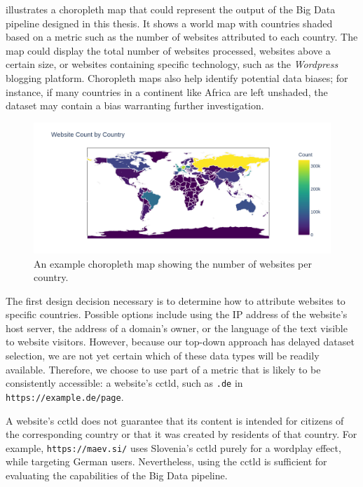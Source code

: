  illustrates a choropleth map that could represent the output of the Big Data pipeline designed in this thesis.
It shows a world map with countries shaded based on a metric such as the number of websites attributed to each country.
The map could display the total number of websites processed, websites above a certain size, or websites containing specific technology, such as the \textit{Wordpress} blogging platform.
Choropleth maps also help identify potential data biases; for instance, if many countries in a continent like Africa are left unshaded, the dataset may contain a bias warranting further investigation.

\begin{figure}[H]
    \centering
    \includegraphics[width=\textwidth]{figures/charts/large/chart_fact_uri_choropleth.png}
    \caption{An example choropleth map showing the number of websites per country.}
    \label{fig:choropleth}
\end{figure}

The first design decision necessary is to determine how to attribute websites to specific countries.
Possible options include using the IP address of the website's host server, the address of a domain's owner, or the language of the text visible to website visitors.
However, because our top-down approach has delayed dataset selection, we are not yet certain which of these data types will be readily available.
Therefore, we choose to use part of a metric that is likely to be consistently accessible: a website's \ac{cctld}, such as \texttt{.de} in \texttt{https://example.de/page}.

A website's \ac{cctld} does not guarantee that its content is intended for citizens of the corresponding country or that it was created by residents of that country.
For example, \texttt{https://\-maev.si/} uses Slovenia's \ac{cctld} purely for a wordplay effect, while targeting German users.
Nevertheless, using the \ac{cctld} is sufficient for evaluating the capabilities of the Big Data pipeline.

